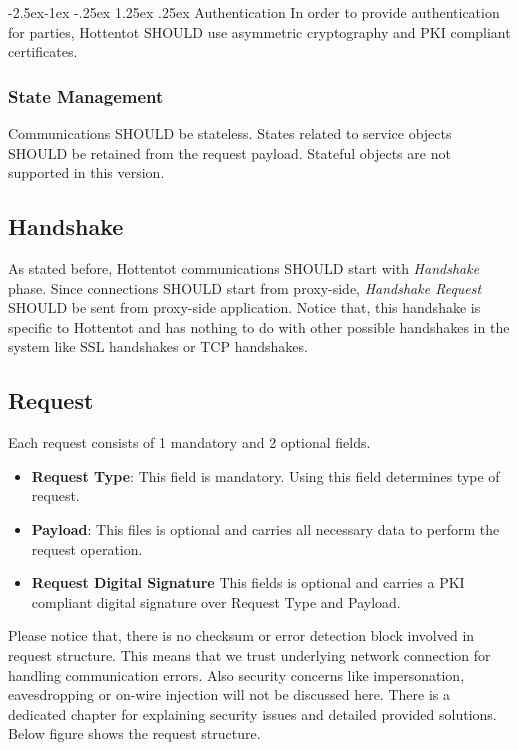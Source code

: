\documentclass[10pt,a4paper]{article}
\makeatletter
\renewcommand\paragraph{\@startsection{paragraph}{4}{\z@}%
            {-2.5ex\@plus -1ex \@minus -.25ex}%
            {1.25ex \@plus .25ex}%
            {\normalfont\normalsize\bfseries}}
\makeatother
\begin{document}
\paragraph{Authentication}
In order to provide authentication for parties, Hottentot SHOULD use asymmetric cryptography and PKI compliant certificates.

\subsubsection{State Management}
Communications SHOULD be stateless. States related to service objects SHOULD be retained from the request payload. Stateful objects are not supported in this version.


\subsection{Handshake}
As stated before, Hottentot communications SHOULD start with \textit{Handshake} phase. Since connections SHOULD start from proxy-side, \textit{Handshake Request} SHOULD be sent from proxy-side application. Notice that, this handshake is specific to Hottentot and has nothing to do with other possible handshakes in the system like SSL handshakes or TCP handshakes.

\subsection{Request}
Each request consists of 1 mandatory and 2 optional fields.
\begin{itemize}
  \item \textbf{Request Type}: This field is mandatory. Using this field determines type of request.
  \item \textbf{Payload}: This files is optional and carries all necessary data to perform the request operation.
  \item \textbf{Request Digital Signature} This fields is optional and carries a PKI compliant digital signature over Request Type and Payload.
\end{itemize} 
Please notice that, there is no checksum or error detection block involved in request structure. This means that we trust underlying network connection for handling communication errors. Also security concerns like impersonation, eavesdropping or on-wire injection will not be discussed here. There is a dedicated chapter for explaining security issues and detailed provided solutions. Below figure shows the request structure.
\end{document}
